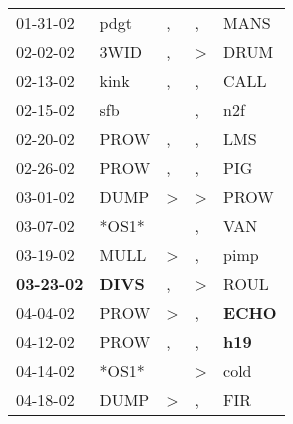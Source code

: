 \begin{supertabular}{p{0.07\textwidth}p{0.06\textwidth}p{0.02\textwidth}p{0.02\textwidth}p{0.06\textwidth}}
          01-31-02\textsuperscript{} &           pdgt\textsuperscript{} &                , &                , &           MANS\textsuperscript{} \\
          02-02-02\textsuperscript{} &           3WID\textsuperscript{} &                , &     \textgreater &           DRUM\textsuperscript{} \\
          02-13-02\textsuperscript{} &           kink\textsuperscript{} &                , &                , &           CALL\textsuperscript{} \\
          02-15-02\textsuperscript{} &            sfb\textsuperscript{} &                  &                , &            n2f\textsuperscript{} \\
          02-20-02\textsuperscript{} &           PROW\textsuperscript{} &                , &                , &            LMS\textsuperscript{} \\
          02-26-02\textsuperscript{} &           PROW\textsuperscript{} &                , &                , &            PIG\textsuperscript{} \\
          03-01-02\textsuperscript{} &           DUMP\textsuperscript{} &     \textgreater &     \textgreater &           PROW\textsuperscript{} \\
          03-07-02\textsuperscript{} &                            *OS1* &                  &                , &            VAN\textsuperscript{} \\
          03-19-02\textsuperscript{} &           MULL\textsuperscript{} &     \textgreater &                , &           pimp\textsuperscript{} \\
 \textbf{03-23-02\textsuperscript{}} &  \textbf{DIVS\textsuperscript{}} &                , &     \textgreater &           ROUL\textsuperscript{} \\
          04-04-02\textsuperscript{} &           PROW\textsuperscript{} &     \textgreater &                , &  \textbf{ECHO\textsuperscript{}} \\
          04-12-02\textsuperscript{} &           PROW\textsuperscript{} &                , &                , &   \textbf{h19\textsuperscript{}} \\
          04-14-02\textsuperscript{} &                            *OS1* &                  &     \textgreater &           cold\textsuperscript{} \\
          04-18-02\textsuperscript{} &           DUMP\textsuperscript{} &     \textgreater &                , &            FIR\textsuperscript{} \\

\end{supertabular}
